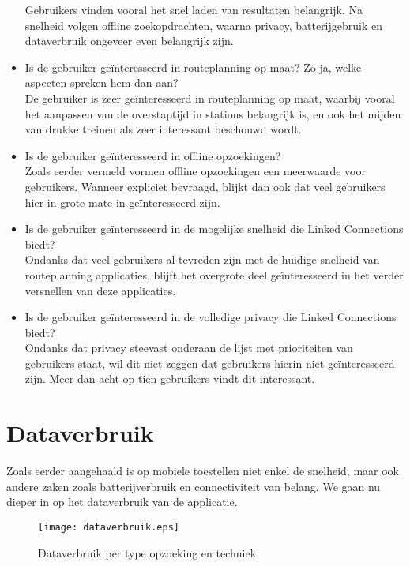 \begin{itemize}
	Gebruikers vinden vooral het snel laden van resultaten belangrijk. Na snelheid volgen offline zoekopdrachten, waarna privacy, batterijgebruik en dataverbruik ongeveer even belangrijk zijn.
	\item Is de gebruiker geïnteresseerd in routeplanning op maat? Zo ja, welke aspecten spreken hem dan aan?\\
	De gebruiker is zeer geïnteresseerd in routeplanning op maat, waarbij vooral het aanpassen van de overstaptijd in stations belangrijk is, en ook het mijden van drukke treinen als zeer interessant beschouwd wordt.
	\item Is de gebruiker geïnteresseerd in offline opzoekingen?\\
	Zoals eerder vermeld vormen offline opzoekingen een meerwaarde voor gebruikers. Wanneer expliciet bevraagd, blijkt dan ook dat veel gebruikers hier in grote mate in geïnteresseerd zijn.
	\item Is de gebruiker geïnteresseerd in de mogelijke snelheid die Linked Connections biedt?\\
	Ondanks dat veel gebruikers al tevreden zijn met de huidige snelheid van routeplanning applicaties, blijft het overgrote deel geïnteresseerd in het verder versnellen van deze applicaties.
	\item Is de gebruiker geïnteresseerd in de volledige privacy die Linked Connections biedt?\\
	Ondanks dat privacy steevast onderaan de lijst met prioriteiten van gebruikers staat, wil dit niet zeggen dat gebruikers hierin niet geïnteresseerd zijn. Meer dan acht op tien gebruikers vindt dit interessant.
\end{itemize}

\section{Dataverbruik}
Zoals eerder aangehaald is op mobiele toestellen niet enkel de snelheid, maar ook andere zaken zoals batterijverbruik en connectiviteit van belang. We gaan nu dieper in op het dataverbruik van de applicatie. 

\begin{figure}[ht]
	\centering
	\texttt{[image: dataverbruik.eps]}
	\caption[Dataverbruik per opzoeking]{Dataverbruik per type opzoeking en techniek}
	\label{fig:dataUsage}
\end{figure}

